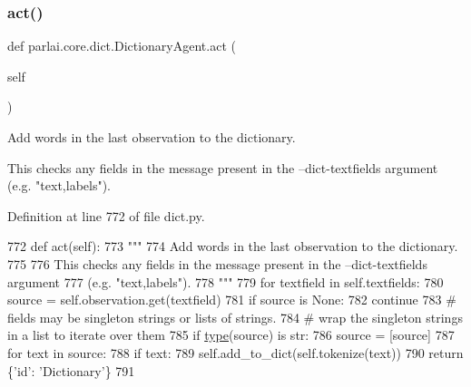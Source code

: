 \subsubsection{\texorpdfstring{act()}{act()}}
{\footnotesize\ttfamily def parlai.\+core.\+dict.\+Dictionary\+Agent.\+act (\begin{DoxyParamCaption}\item[{}]{self }\end{DoxyParamCaption})}

\begin{DoxyVerb}Add words in the last observation to the dictionary.

This checks any fields in the message present in the --dict-textfields argument
(e.g. "text,labels").
\end{DoxyVerb}
 

Definition at line 772 of file dict.\+py.


\begin{DoxyCode}
772     \textcolor{keyword}{def }act(self):
773         \textcolor{stringliteral}{"""}
774 \textcolor{stringliteral}{        Add words in the last observation to the dictionary.}
775 \textcolor{stringliteral}{}
776 \textcolor{stringliteral}{        This checks any fields in the message present in the --dict-textfields argument}
777 \textcolor{stringliteral}{        (e.g. "text,labels").}
778 \textcolor{stringliteral}{        """}
779         \textcolor{keywordflow}{for} textfield \textcolor{keywordflow}{in} self.textfields:
780             source = self.observation.get(textfield)
781             \textcolor{keywordflow}{if} source \textcolor{keywordflow}{is} \textcolor{keywordtype}{None}:
782                 \textcolor{keywordflow}{continue}
783             \textcolor{comment}{# fields may be singleton strings or lists of strings.}
784             \textcolor{comment}{# wrap the singleton strings in a list to iterate over them}
785             \textcolor{keywordflow}{if} \hyperlink{namespaceparlai_1_1agents_1_1tfidf__retriever_1_1build__tfidf_ad5dfae268e23f506da084a9efb72f619}{type}(source) \textcolor{keywordflow}{is} str:
786                 source = [source]
787             \textcolor{keywordflow}{for} text \textcolor{keywordflow}{in} source:
788                 \textcolor{keywordflow}{if} text:
789                     self.add\_to\_dict(self.tokenize(text))
790         \textcolor{keywordflow}{return} \{\textcolor{stringliteral}{'id'}: \textcolor{stringliteral}{'Dictionary'}\}
791 
\end{DoxyCode}
\mbox{\label{classparlai_1_1core_1_1dict_1_1DictionaryAgent_ad09f8ecf2b258ecaebce69d9cef9ff3c}} 
